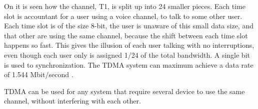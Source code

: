 On  it is seen how the channel, T1, is split up into 24 smaller pieces.
Each time slot is accountant for a user using a voice channel, to talk to some other user.
Each time slot is of the size 8-bit, the user is unaware of this small data size, and that other are using the same channel, because the shift between each time slot happens so fast.
This gives the illusion of each user talking with no interruptions, even though each user only is assigned 1/24 of the total bandwidth.
A single bit is used to synchronization.
The TDMA system can maximum achieve a data rate of 1.544 Mbit/second \cite{TDMA}.

TDMA can be used for any system that require several device to use the same channel, without interfering with each other.





